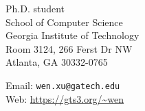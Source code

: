 \begin{minipage}[t]{0.45\textwidth}
  Ph.D. student\\
  School of Computer Science\\
  Georgia Institute of Technology\\
  Room 3124, 266 Ferst Dr NW\\
  Atlanta, GA 30332-0765
\end{minipage}
\begin{minipage}[t]{0.45\textwidth}
  Email: \texttt{wen.xu@gatech.edu} \\
  Web: \url{https://gts3.org/~wen} \\
\end{minipage}
